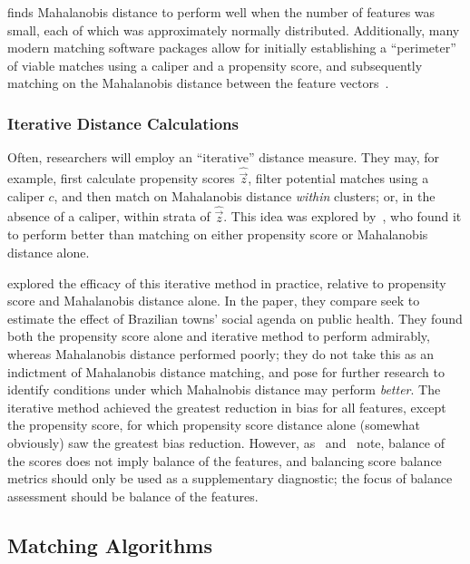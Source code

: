 \documentclass[11pt]{extarticle}
\begin{document}
\textcite{leacy_joint_2014} finds Mahalanobis distance to perform well when the number of features was small, each of which was approximately normally distributed. Additionally, many modern matching software packages allow for initially establishing a ``perimeter'' of viable matches using a caliper and a propensity score, and subsequently matching on the Mahalanobis distance between the feature vectors~\parencite{ho_matchit_2011}.

\subsubsection{Iterative Distance Calculations}

Often, researchers will employ an ``iterative'' distance measure. They may, for example, first calculate propensity scores $\widehat{\vec{z}}$, filter potential matches using a caliper $c$, and then match on Mahalanobis distance \emph{within} clusters; or, in the absence of a caliper, within strata of $\widehat{\vec{z}}$. This idea was explored by~\textcite{rosenbaum_constructing_1985}, who found it to perform better than matching on either propensity score or Mahalanobis distance alone.

\textcite{baltar_mahalanobis_2014} explored the efficacy of this iterative method in practice, relative to propensity score and Mahalanobis distance alone. In the paper, they compare seek to estimate the effect of Brazilian towns' social agenda on public health. They found both the propensity score alone and iterative method to perform admirably, whereas Mahalanobis distance performed poorly; they do not take this as an indictment of Mahalanobis distance matching, and pose for further research to identify conditions under which Mahalnobis distance may perform \emph{better}. The iterative method achieved the greatest reduction in bias for all features, except the propensity score, for which propensity score distance alone (somewhat obviously) saw the greatest bias reduction. However, as~\textcite{austin_optimal_2011} and~\textcite{greifer_assessing_2022} note, balance of the scores does not imply balance of the features, and balancing score balance metrics should only be used as a supplementary diagnostic; the focus of balance assessment should be balance of the features.

\subsection{Matching Algorithms}
\end{document}

